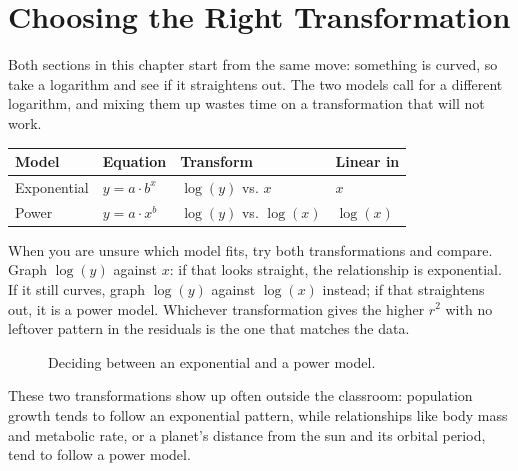 \section{Choosing the Right Transformation}

Both sections in this chapter start from the same move: something is curved, so take a logarithm and see if it straightens out. The two models call for a different logarithm, and mixing them up wastes time on a transformation that will not work.

\begin{table}[H]
\centering
\begin{tabular}{l|l|l|l}
Model & Equation & Transform & Linear in \\
\hline
Exponential & $y = a \cdot b^x$ & $\log(y)$ vs. $x$ & $x$ \\
Power & $y = a \cdot x^b$ & $\log(y)$ vs. $\log(x)$ & $\log(x)$
\end{tabular}
\end{table}

When you are unsure which model fits, try both transformations and compare. Graph $\log(y)$ against $x$: if that looks straight, the relationship is exponential. If it still curves, graph $\log(y)$ against $\log(x)$ instead; if that straightens out, it is a power model. Whichever transformation gives the higher $r^2$ with no leftover pattern in the residuals is the one that matches the data.

\begin{figure}[H]
    \centering
    \caption{Deciding between an exponential and a power model.}
    \label{fig:choosingTransform}
\end{figure}

These two transformations show up often outside the classroom: population growth tends to follow an exponential pattern, while relationships like body mass and metabolic rate, or a planet's distance from the sun and its orbital period, tend to follow a power model.
